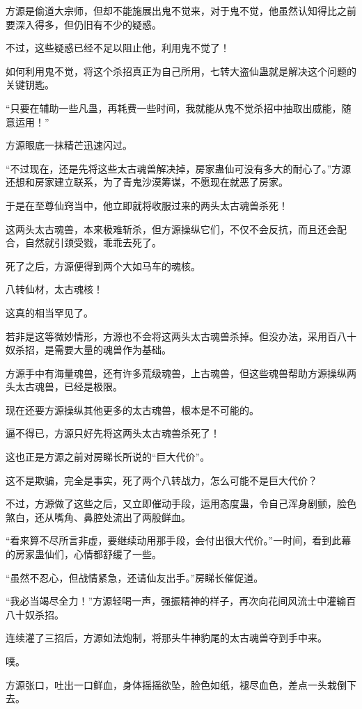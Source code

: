 \begin{this_body}
方源是偷道大宗师，但却不能施展出鬼不觉来，对于鬼不觉，他虽然认知得比之前要深入得多，但仍旧有不少的疑惑。

不过，这些疑惑已经不足以阻止他，利用鬼不觉了！

如何利用鬼不觉，将这个杀招真正为自己所用，七转大盗仙蛊就是解决这个问题的关键钥匙。

“只要在辅助一些凡蛊，再耗费一些时间，我就能从鬼不觉杀招中抽取出威能，随意运用！”

方源眼底一抹精芒迅速闪过。

“不过现在，还是先将这些太古魂兽解决掉，房家蛊仙可没有多大的耐心了。”方源还想和房家建立联系，为了青鬼沙漠筹谋，不愿现在就恶了房家。

于是在至尊仙窍当中，他立即就将收服过来的两头太古魂兽杀死！

这两头太古魂兽，本来极难斩杀，但方源操纵它们，不仅不会反抗，而且还会配合，自然就引颈受戮，乖乖去死了。

死了之后，方源便得到两个大如马车的魂核。

八转仙材，太古魂核！

这真的相当罕见了。

若非是这等微妙情形，方源也不会将这两头太古魂兽杀掉。但没办法，采用百八十奴杀招，是需要大量的魂兽作为基础。

方源手中有海量魂兽，还有许多荒级魂兽，上古魂兽，但这些魂兽帮助方源操纵两头太古魂兽，已经是极限。

现在还要方源操纵其他更多的太古魂兽，根本是不可能的。

逼不得已，方源只好先将这两头太古魂兽杀死了！

这也正是方源之前对房睇长所说的“巨大代价”。

这不是欺骗，完全是事实，死了两个八转战力，怎么可能不是巨大代价？

不过，方源做了这些之后，又立即催动手段，运用态度蛊，令自己浑身剧颤，脸色煞白，还从嘴角、鼻腔处流出了两股鲜血。

“看来算不尽所言非虚，要继续动用那手段，会付出很大代价。”一时间，看到此幕的房家蛊仙们，心情都舒缓了一些。

“虽然不忍心，但战情紧急，还请仙友出手。”房睇长催促道。

“我必当竭尽全力！”方源轻喝一声，强振精神的样子，再次向花间风流士中灌输百八十奴杀招。

连续灌了三招后，方源如法炮制，将那头牛神豹尾的太古魂兽夺到手中来。

噗。

方源张口，吐出一口鲜血，身体摇摇欲坠，脸色如纸，褪尽血色，差点一头栽倒下去。


\end{this_body}
